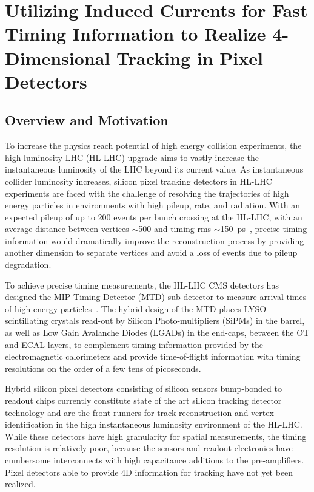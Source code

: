 
\chapter{Utilizing Induced Currents for Fast Timing Information to Realize 4-Dimensional Tracking in Pixel Detectors}

\section{Overview and Motivation}
To increase the physics reach potential of high energy collision experiments, the high luminosity LHC (HL-LHC) upgrade aims to vastly increase the instantaneous luminosity of the LHC beyond its current value. 
As instantaneous collider luminosity increases, silicon pixel tracking detectors in HL-LHC experiments are faced with the challenge of resolving the trajectories of high energy particles in environments with high pileup, rate, and radiation.
With an expected pileup of up to 200 events per bunch crossing at the HL-LHC, with an average distance between vertices $\sim$\SI{500}{\micron} and timing rms $\sim$\SI{150}{\ps}~\cite{CARTIGLIA201747}, precise timing information would dramatically improve the reconstruction process by providing another dimension to separate vertices and avoid a loss of events due to pileup degradation.

To achieve precise timing measurements, the HL-LHC CMS detectors has designed the MIP Timing Detector (MTD) sub-detector to measure arrival times of high-energy particles~\cite{CMS:2667167}.
The hybrid design of the MTD places LYSO scintillating crystals read-out by Silicon Photo-multipliers (SiPMs) in the barrel, as well as Low Gain Avalanche Diodes (LGADs) in the end-caps, between the OT and ECAL layers, to complement timing information provided by the electromagnetic calorimeters and provide time-of-flight information with timing resolutions on the order of a few tens of picoseconds.

Hybrid silicon pixel detectors consisting of silicon sensors bump-bonded to readout chips currently constitute state of the art silicon tracking detector technology and are the front-runners for track reconstruction and vertex identification in the high instantaneous luminosity environment of the HL-LHC.
While these detectors have high granularity for spatial measurements, the timing resolution is relatively poor, because the sensors and readout electronics have cumbersome interconnects with high capacitance additions to the pre-amplifiers. 
Pixel detectors able to provide 4D information for tracking have not yet been realized.

